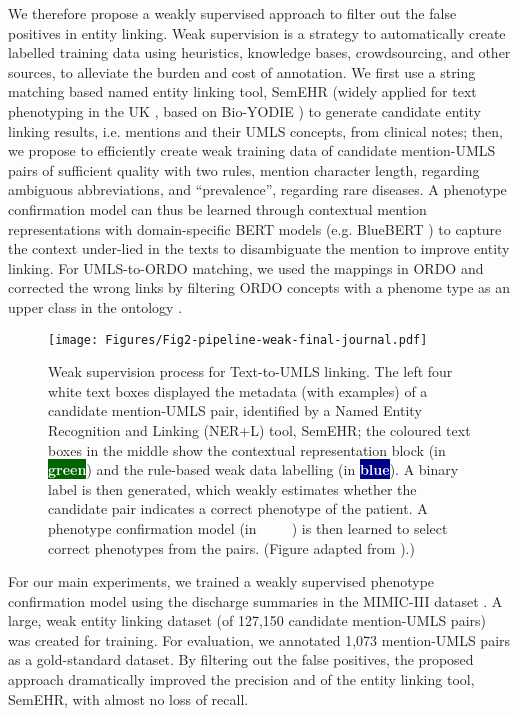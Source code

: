 \documentclass[twocolumn]{bmcart}
\begin{document}
We therefore propose a weakly supervised approach to filter out the false positives in entity linking. Weak supervision \cite{wang_clinical_2019,ratner2019} is a strategy to automatically create labelled training data using heuristics, knowledge bases, crowdsourcing, and other sources, to alleviate the burden and cost of annotation. We first use a string matching based named entity linking tool, SemEHR \cite{Wu2018semehr} (widely applied for text phenotyping in the UK \cite{Wu2018semehr,wu2019,gorinski_named_2019}, based on Bio-YODIE \cite{gorrell2018}) to generate candidate entity linking results, i.e. mentions and their UMLS concepts, from clinical notes; then, we propose to efficiently create weak training data of candidate mention-UMLS pairs of sufficient quality with two rules, mention character length, regarding ambiguous abbreviations, and ``prevalence'', regarding rare diseases. A phenotype confirmation model can thus be learned through contextual mention representations with domain-specific BERT models (e.g. BlueBERT \cite{peng2019transfer}) to capture the context under-lied in the texts to disambiguate the mention to improve entity linking. For UMLS-to-ORDO matching, we used the mappings in ORDO and corrected the wrong links by filtering ORDO concepts with a phenome type as an upper class in the ontology \cite{vasant2014ordo}. 

\begin{figure*}[ht]
  \centering
  \texttt{[image: Figures/Fig2-pipeline-weak-final-journal.pdf]}
  \caption{Weak supervision process for Text-to-UMLS linking. The left four white text boxes displayed the metadata (with examples) of a candidate mention-UMLS pair, identified by a Named Entity Recognition and Linking (NER+L) tool, SemEHR; the coloured text boxes in the middle show the contextual representation block (in \colorbox{darkgreen}{\textcolor{white}{\textbf{green}}}) and the rule-based weak data labelling (in \colorbox{darkblue}{\textcolor{white}{\textbf{blue}}}). A binary label is then generated, which weakly estimates whether the candidate pair indicates a correct phenotype of the patient. A phenotype confirmation model (in \colorbox{mediumgrey}{\textcolor{white}{\textbf{grey}}}) is then learned to select correct phenotypes from the pairs. (Figure adapted from \cite{dong2021rare}).)}\label{pipeline-weak}
\end{figure*}

For our main experiments, we trained a weakly supervised phenotype confirmation model using the discharge summaries in the MIMIC-III dataset \cite{johnson_mimic-iii_2016}. A large, weak entity linking dataset (of 127,150 candidate mention-UMLS pairs) was created for training. For evaluation, we annotated 1,073 mention-UMLS pairs as a gold-standard dataset. By filtering out the false positives, the proposed approach dramatically improved the precision and  of the entity linking tool, SemEHR, with almost no loss of recall.
\end{document}
